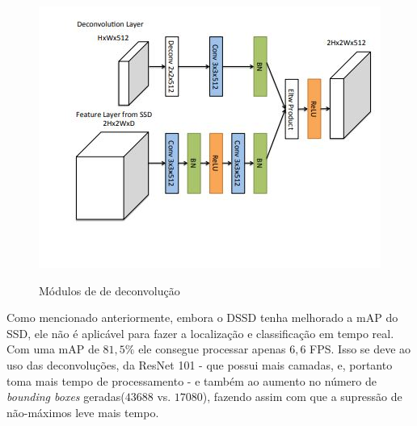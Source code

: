 \begin{figure}[H]
	\setlength{\abovecaptionskip}{0pt}
	\setlength{\belowcaptionskip}{0pt}
	\caption[Módulos de deconvolução]{Módulos de de deconvolução}
	\centering
	\includegraphics[width=.6\textwidth]{imagem/0x_dssd-deconv.jpg}
	\captionsetup{justification=centering}
	\label{fig:deconv}
\end{figure}

Como mencionado anteriormente, embora o \ac{DSSD} tenha melhorado a \ac{mAP} do \ac{SSD}, ele não é aplicável para fazer a localização e classificação em tempo real. Com uma \ac{mAP} de $81,5\%$ ele consegue processar apenas $6,6$ \ac{FPS}. Isso se deve ao uso das deconvoluções, da ResNet 101 - que possui mais camadas, e, portanto toma mais tempo de processamento - e também ao aumento no número de \textit{bounding boxes} geradas($43688$ vs. $17080$), fazendo assim com que a supressão de não-máximos leve mais tempo.